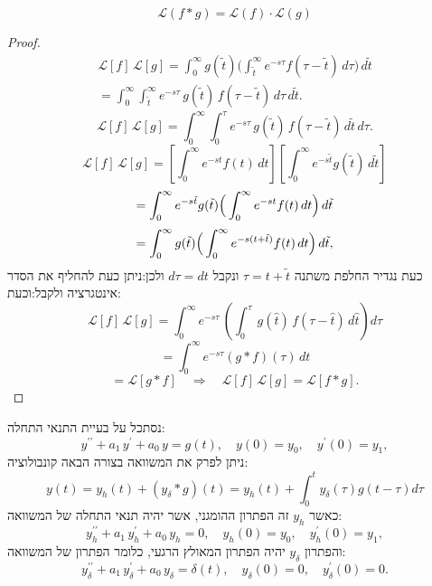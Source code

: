 \documentclass{tstextbook}
\begin{document}
\begin{proposition}
$$\mathcal{L}(f * g) = \mathcal{L}(f) \cdot \mathcal{L}(g)$$

\end{proposition}
\begin{proof}
$$\begin{gather}{{{\mathcal{L}}[f]\,{\mathcal{L}}[g]=\int_{0}^{\infty}g(\tilde{t})\Big(\int_{\tilde{t}}^{\infty}e^{-s\tau}f(\tau-\tilde{t})\,d\tau\Big)\,d\tilde{t}}}\\ {{=\int_{0}^{\infty}\int_{\tilde{t}}^{\infty}e^{-s\tau}\,g(\tilde{t})\,f(\tau-\tilde{t})\,d\tau\,d\tilde{t}.}}\end{gather}$$$${\mathcal{L}}[f]\,{\mathcal{L}}[g]=\int_{0}^{\infty}\int_{0}^{\tau}e^{-s\tau}\,g(\tilde{t})\,f(\tau-\tilde{t})\,d\tilde{t}\,d\tau.$$$$\mathcal{L}[f]\,\mathcal{L}[g]=\left[\int_{0}^{\infty}e^{-s t}f(t)\,d t\right]\left[\int_{0}^{\infty}e^{-s\tilde{t}}g(\tilde{t})\,d\tilde{t}\right]$$$$=\int_{0}^{\infty}e^{-s\tilde{t}}g(\tilde{t})\Big{(}\int_{0}^{\infty}e^{-s t}f(t)\,d t\Big{)}\,d\tilde{t}$$$$=\int_{0}^{\infty}g(\tilde{t})\Big{(}\int_{0}^{\infty}e^{-s(t+\tilde{t})}f(t)\,d t\Big{)}\,d\tilde{t},$$כעת נגדיר החלפת משתנה \(\tau=t+\tilde{t}\) ונקבל \(d\tau=dt\) ולכן:ניתן כעת להחליף את הסדר אינטגרציה ולקבל:וכעת:
$$\mathcal{L}[f]\,\mathcal{L}[g]=\int_{0}^{\infty}e^{-s\tau}\,\left(\int_{0}^{\tau}\,g(\hat{t})\,f(\tau-\hat{t})\,d\hat{t}\right)d\tau$$$$=\int_{0}^{\infty}e^{-s\tau}(g*f)(\tau)\,dt$$$$=\mathcal{L}[g*f]\quad\Rightarrow\quad\mathcal{L}[f]\,\mathcal{L}[g]=\mathcal{L}[f*g].$$

\end{proof}
\begin{proposition}
נסתכל על בעיית התנאי התחלה:
$$y^{\prime\prime}+a_{1}\,y^{\prime}+a_{0}\,y=g(t),\quad y(0)=y_{0},\quad y^{\prime}(0)=y_{1},$$
ניתן לפרק את המשוואה בצורה הבאה קונבולוציה:
$$y(t)=y_{h}(t)+\left( y_{\delta}*g \right)(t)=y_{h}(t)+\int_{0}^{t}y_{\delta}\left( \tau \right)g\left( t-\tau \right)d\tau$$
כאשר \(y_{h}\) זה הפתרון ההומגני, אשר יהיה תנאי התחלה של המשוואה:
$$y_{h}^{\prime\prime}+a_{1}\,y_{h}^{\prime}+a_{0}\,y_{h}=0,\quad y_{h}(0)=y_{0},\quad y_{h}^{\prime}(0)=y_{1},$$
והפתרון \(y_{\delta}\) יהיה הפתרון המאולץ הרגעי, כלומר הפתרון של המשוואה:
$$y_{\delta}^{\prime\prime}+a_{1}\,y_{\delta}^{\prime}+a_{0}\,y_{\delta}=\delta(t),\quad y_{\delta}(0)=0,\quad y_{\delta}^{\prime}(0)=0.$$

\end{proposition}
\end{document}
